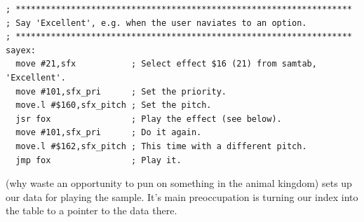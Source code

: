 \begin{lstlisting}
; *******************************************************************
; Say 'Excellent', e.g. when the user naviates to an option.
; *******************************************************************
sayex:
  move #21,sfx           ; Select effect $16 (21) from samtab, 'Excellent'.
  move #101,sfx_pri      ; Set the priority.
  move.l #$160,sfx_pitch ; Set the pitch.
  jsr fox                ; Play the effect (see below).
  move #101,sfx_pri      ; Do it again.
  move.l #$162,sfx_pitch ; This time with a different pitch.
  jmp fox                ; Play it.
\end{lstlisting}

 (why waste an opportunity to pun on  something in the animal kingdom) sets
up our data for playing the sample. It's main preoccupation is turning our index into
the  table to a pointer to the data there.

